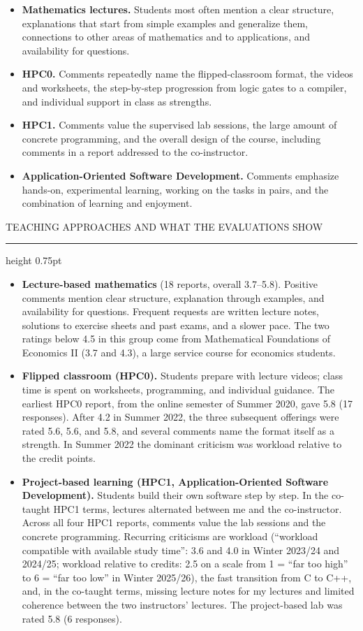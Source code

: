 \documentclass[10pt]{article}
\newcommand{\headsize}{\fontsize{10.5pt}{12.8pt}\selectfont}
\newcommand{\cvsection}[1]{%
  \par\vspace{9pt}%
  {\headsize\bfseries\color{heading}\strut#1\par}%
  \nopagebreak\vspace{1pt}%
  {\color{rule}\hrule height 0.75pt}%
  \nopagebreak\vspace{3pt}%
  \prevdepth=2.7pt\relax
}
\newenvironment{cvitems}
  {\begin{itemize}[label=•, leftmargin=15pt, labelwidth=10pt, labelsep=0pt,
                   align=left, topsep=0pt, partopsep=0pt, parsep=0pt,
                   itemsep=2pt, beginpenalty=10000]}
  {\end{itemize}\vspace{3pt}}
\begin{document}
\begin{cvitems}
  \item \textbf{Mathematics lectures.} Students most often mention a clear structure, explanations that start from simple examples and generalize them, connections to other areas of mathematics and to applications, and availability for questions.
  \item \textbf{HPC0.} Comments repeatedly name the flipped-classroom format, the videos and worksheets, the step-by-step progression from logic gates to a compiler, and individual support in class as strengths.
  \item \textbf{HPC1.} Comments value the supervised lab sessions, the large amount of concrete programming, and the overall design of the course, including comments in a report addressed to the co-instructor.
  \item \textbf{Application-Oriented Software Development.} Comments emphasize hands-on, experimental learning, working on the tasks in pairs, and the combination of learning and enjoyment.
\end{cvitems}

\cvsection{TEACHING APPROACHES AND WHAT THE EVALUATIONS SHOW}

\begin{cvitems}
  \item \textbf{Lecture-based mathematics} (18 reports, overall 3.7–5.8). Positive comments mention clear structure, explanation through examples, and availability for questions. Frequent requests are written lecture notes, solutions to exercise sheets and past exams, and a slower pace. The two ratings below 4.5 in this group come from Mathematical Foundations of Economics II (3.7 and 4.3), a large service course for economics students.
  \item \textbf{Flipped classroom (HPC0).} Students prepare with lecture videos; class time is spent on worksheets, programming, and individual guidance. The earliest HPC0 report, from the online semester of Summer 2020, gave 5.8 (17 responses). After 4.2 in Summer 2022, the three subsequent offerings were rated 5.6, 5.6, and 5.8, and several comments name the format itself as a strength. In Summer 2022 the dominant criticism was workload relative to the credit points.
  \item \textbf{Project-based learning (HPC1, Application-Oriented Software Development).} Students build their own software step by step. In the co-taught HPC1 terms, lectures alternated between me and the co-instructor. Across all four HPC1 reports, comments value the lab sessions and the concrete programming. Recurring criticisms are workload (“workload compatible with available study time”: 3.6 and 4.0 in Winter 2023/24 and 2024/25; workload relative to credits: 2.5 on a scale from 1 = “far too high” to 6 = “far too low” in Winter 2025/26), the fast transition from C to C++, and, in the co-taught terms, missing lecture notes for my lectures and limited coherence between the two instructors' lectures. The project-based lab was rated 5.8 (6 responses).
\end{cvitems}
\end{document}
